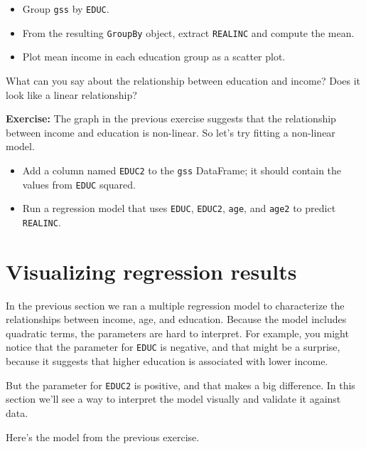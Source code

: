 \begin{itemize}
\item
  Group \passthrough{\lstinline!gss!} by \passthrough{\lstinline!EDUC!}.
\item
  From the resulting \passthrough{\lstinline!GroupBy!} object, extract
  \passthrough{\lstinline!REALINC!} and compute the mean.
\item
  Plot mean income in each education group as a scatter plot.
\end{itemize}

What can you say about the relationship between education and income?
Does it look like a linear relationship?

\textbf{Exercise:} The graph in the previous exercise suggests that the
relationship between income and education is non-linear. So let's try
fitting a non-linear model.

\begin{itemize}
\item
  Add a column named \passthrough{\lstinline!EDUC2!} to the
  \passthrough{\lstinline!gss!} DataFrame; it should contain the values
  from \passthrough{\lstinline!EDUC!} squared.
\item
  Run a regression model that uses \passthrough{\lstinline!EDUC!},
  \passthrough{\lstinline!EDUC2!}, \passthrough{\lstinline!age!}, and
  \passthrough{\lstinline!age2!} to predict
  \passthrough{\lstinline!REALINC!}.
\end{itemize}

\hypertarget{visualizing-regression-results}{%
\section{Visualizing regression
results}\label{visualizing-regression-results}}

In the previous section we ran a multiple regression model to
characterize the relationships between income, age, and education.
Because the model includes quadratic terms, the parameters are hard to
interpret. For example, you might notice that the parameter for
\passthrough{\lstinline!EDUC!} is negative, and that might be a
surprise, because it suggests that higher education is associated with
lower income.

But the parameter for \passthrough{\lstinline!EDUC2!} is positive, and
that makes a big difference. In this section we'll see a way to
interpret the model visually and validate it against data.

Here's the model from the previous exercise.

